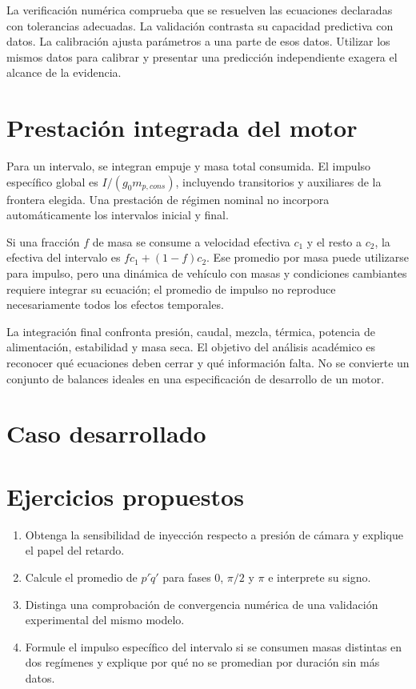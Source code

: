 La verificación numérica comprueba que se resuelven las ecuaciones declaradas con tolerancias adecuadas. La validación contrasta su capacidad predictiva con datos. La calibración ajusta parámetros a una parte de esos datos. Utilizar los mismos datos para calibrar y presentar una predicción independiente exagera el alcance de la evidencia.
\section{Prestación integrada del motor}
Para un intervalo, se integran empuje y masa total consumida. El impulso específico global es $I/(g_0m_{p,cons})$, incluyendo transitorios y auxiliares de la frontera elegida. Una prestación de régimen nominal no incorpora automáticamente los intervalos inicial y final.

Si una fracción $f$ de masa se consume a velocidad efectiva $c_1$ y el resto a $c_2$, la efectiva del intervalo es $fc_1+(1-f)c_2$. Ese promedio por masa puede utilizarse para impulso, pero una dinámica de vehículo con masas y condiciones cambiantes requiere integrar su ecuación; el promedio de impulso no reproduce necesariamente todos los efectos temporales.

La integración final confronta presión, caudal, mezcla, térmica, potencia de alimentación, estabilidad y masa seca. El objetivo del análisis académico es reconocer qué ecuaciones deben cerrar y qué información falta. No se convierte un conjunto de balances ideales en una especificación de desarrollo de un motor.
\section{Caso desarrollado}

\section{Ejercicios propuestos}
\begin{enumerate}
\item Obtenga la sensibilidad de inyección respecto a presión de cámara y explique el papel del retardo.
\item Calcule el promedio de $p'\dot q'$ para fases 0, $\pi/2$ y $\pi$ e interprete su signo.
\item Distinga una comprobación de convergencia numérica de una validación experimental del mismo modelo.
\item Formule el impulso específico del intervalo si se consumen masas distintas en dos regímenes y explique por qué no se promedian por duración sin más datos.
\end{enumerate}


\studiumchaptercheck

